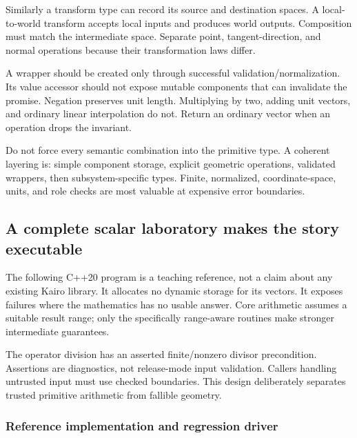 Similarly a transform type can record its source and destination spaces. A local-to-world transform accepts local inputs and produces world outputs. Composition must match the intermediate space. Separate point, tangent-direction, and normal operations because their transformation laws differ.

A  wrapper should be created only through successful validation/normalization. Its value accessor should not expose mutable components that can invalidate the promise. Negation preserves unit length. Multiplying by two, adding unit vectors, and ordinary linear interpolation do not. Return an ordinary vector when an operation drops the invariant.

Do not force every semantic combination into the primitive type. A coherent layering is: simple component storage, explicit geometric operations, validated wrappers, then subsystem-specific types. Finite, normalized, coordinate-space, units, and role checks are most valuable at expensive error boundaries.

\subsection{A complete scalar laboratory makes the story executable}\label{02-foundations-ii-ch037-a-complete-scalar-laboratory-makes-the-story-executable}

\hypertarget{02-foundations-ii-ch037-a-complete-scalar-laboratory-makes-the-story-executable}{}

The following C++20 program is a teaching reference, not a claim about any existing Kairo library. It allocates no dynamic storage for its vectors. It exposes failures where the mathematics has no usable answer. Core arithmetic assumes a suitable result range; only the specifically range-aware routines make stronger intermediate guarantees.

The operator division has an asserted finite/nonzero divisor precondition. Assertions are diagnostics, not release-mode input validation. Callers handling untrusted input must use checked boundaries. This design deliberately separates trusted primitive arithmetic from fallible geometry.

\subsubsection{Reference implementation and regression driver}\label{02-foundations-ii-ch037-reference-implementation-and-regression-driver}

